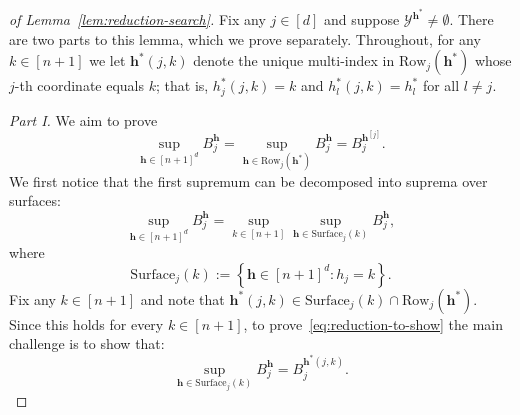 \begin{proof}[of Lemma~\ref{lem:reduction-search}]
Fix any $j\in[d]$ and suppose $\mathcal{Y}^{\mathbf{h}^*}\neq\emptyset$. There are two parts to this lemma, which we prove separately.
Throughout, for any $k \in [n+1]$ we let $\mathbf{h}^*(j,k)$ denote the unique multi-index in $\mathrm{Row}_j(\mathbf{h}^*)$ whose $j$-th coordinate equals $k$; that is, $h^*_j(j,k) = k$ and $h^*_l(j,k) = h^*_l$ for all $l \neq j$.

\textit{Part I.} We aim to prove
\begin{equation}
\sup_{\mathbf{h}\in[n+1]^d}B^{\mathbf{h}}_j
=\sup_{\mathbf{h}\in\mathrm{Row}_j(\mathbf{h}^*)}B^{\mathbf{h}}_j
=B^{\mathbf{h}^{[j]}}_j.
\label{eq:reduction-to-show}
\end{equation}
We first notice that the first supremum can be decomposed into suprema over surfaces:
\[
\sup_{\mathbf{h} \in [n+1]^d}B^{\mathbf{h}}_j = \sup_{k \in [n+1]}\sup_{\mathbf{h} \in \mathrm{Surface}_j(k)}B^{\mathbf{h}}_j,
\]
where
\[
  \mathrm{Surface}_j(k) := \left\{\mathbf{h} \in [n+1]^d: h_j = k \right\}.
\]
Fix any $k \in [n+1]$ and note that $\mathbf{h}^*(j,k) \in \mathrm{Surface}_j(k) \cap \mathrm{Row}_j(\mathbf{h}^*)$. Since this holds for every $k \in [n+1]$, to prove~\eqref{eq:reduction-to-show} the main challenge is to show that:
\begin{equation}
    \sup_{\mathbf{h} \in \mathrm{Surface}_j(k)}B^{\mathbf{h}}_j = B^{\mathbf{h}^*({j,k})}_j.
    \label{eq:surface}
\end{equation}


\end{proof}
